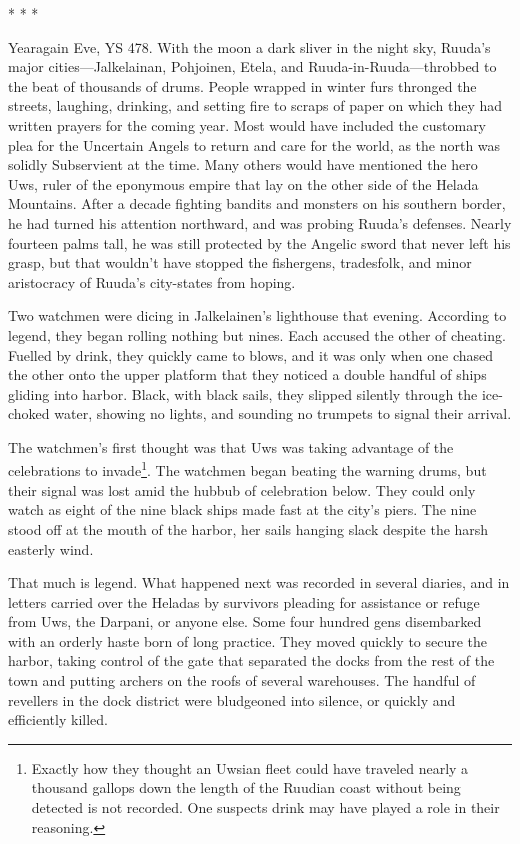 \documentclass[12pt]{report}
\begin{document}
\begin{center}
* * *
\end{center}

Yearagain Eve, YS 478.  With the moon a dark sliver in the night sky,
Ruuda's major cities---Jalkelainan, Pohjoinen, Etela, and
Ruuda-in-Ruuda---throbbed to the beat of thousands of drums.  People
wrapped in winter furs thronged the streets, laughing, drinking, and
setting fire to scraps of paper on which they had written prayers for
the coming year.  Most would have included the customary plea for the
Uncertain Angels to return and care for the world, as the north was
solidly Subservient at the time.  Many others would have mentioned the
hero Uws, ruler of the eponymous empire that lay on the other side of
the Helada Mountains.  After a decade fighting bandits and monsters on
his southern border, he had turned his attention northward, and was
probing Ruuda's defenses.  Nearly fourteen palms tall, he was still
protected by the Angelic sword that never left his grasp, but that
wouldn't have stopped the fishergens, tradesfolk, and minor
aristocracy of Ruuda's city-states from hoping.

Two watchmen were dicing in Jalkelainen's lighthouse that evening.
According to legend, they began rolling nothing but nines.  Each
accused the other of cheating.  Fuelled by drink, they quickly came to
blows, and it was only when one chased the other onto the upper
platform that they noticed a double handful of ships gliding into
harbor.  Black, with black sails, they slipped silently through the
ice-choked water, showing no lights, and sounding no trumpets to
signal their arrival.

The watchmen's first thought was that Uws was taking advantage of the
celebrations to invade\footnote{Exactly how they thought an Uwsian
fleet could have traveled nearly a thousand gallops down the length of
the Ruudian coast without being detected is not recorded.  One
suspects drink may have played a role in their reasoning.}.  The
watchmen began beating the warning drums, but their signal was lost
amid the hubbub of celebration below.  They could only watch as eight
of the nine black ships made fast at the city's piers.  The nine stood
off at the mouth of the harbor, her sails hanging slack despite the
harsh easterly wind.

That much is legend.  What happened next was recorded in several
diaries, and in letters carried over the Heladas by survivors pleading
for assistance or refuge from Uws, the Darpani, or anyone else.  Some
four hundred gens disembarked with an orderly haste born of long
practice.  They moved quickly to secure the harbor, taking control of
the gate that separated the docks from the rest of the town and
putting archers on the roofs of several warehouses.  The handful of
revellers in the dock district were bludgeoned into silence, or
quickly and efficiently killed.
\end{document}
